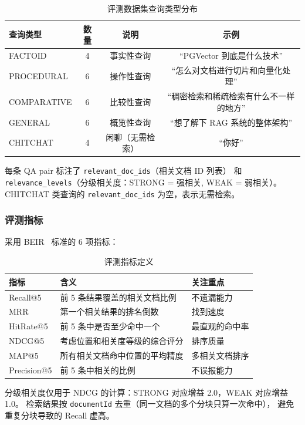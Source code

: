 \documentclass[a4paper, 12pt]{ctexart}
\begin{document}
\begin{table}[H]
  \centering
  \caption{评测数据集查询类型分布}
  \label{tab:dataset}
  \begin{tabular}{lccc}
    \toprule
    查询类型 & 数量 & 说明 & 示例 \\
    \midrule
    FACTOID & 4 & 事实性查询 & ``PGVector 到底是什么技术'' \\
    PROCEDURAL & 6 & 操作性查询 & ``怎么对文档进行切片和向量化处理'' \\
    COMPARATIVE & 6 & 比较性查询 & ``稠密检索和稀疏检索有什么不一样的地方'' \\
    GENERAL & 6 & 概览性查询 & ``想了解下 RAG 系统的整体架构'' \\
    CHITCHAT & 4 & 闲聊（无需检索） & ``你好'' \\
    \bottomrule
  \end{tabular}
\end{table}

每条 QA pair 标注了 \texttt{relevant\_doc\_ids}（相关文档 ID 列表）
和 \texttt{relevance\_levels}（分级相关度：STRONG = 强相关, WEAK = 弱相关）。
CHITCHAT 类查询的 \texttt{relevant\_doc\_ids} 为空，表示无需检索。

\subsubsection{评测指标}

采用 BEIR~\cite{thakur2021beir} 标准的 6 项指标：

\begin{table}[H]
  \centering
  \caption{评测指标定义}
  \label{tab:metrics}
  \begin{tabular}{lll}
    \toprule
    指标 & 含义 & 关注重点 \\
    \midrule
    Recall@5 & 前 5 条结果覆盖的相关文档比例 & 不遗漏能力 \\
    MRR & 第一个相关结果的排名倒数 & 找到速度 \\
    HitRate@5 & 前 5 条中是否至少命中一个 & 最直观的命中率 \\
    NDCG@5 & 考虑位置和相关度等级的综合评分 & 排序质量 \\
    MAP@5 & 所有相关文档命中位置的平均精度 & 多相关文档排序 \\
    Precision@5 & 前 5 条中相关的比例 & 不误报能力 \\
    \bottomrule
  \end{tabular}
\end{table}

分级相关度仅用于 NDCG 的计算：STRONG 对应增益 2.0，WEAK 对应增益 1.0。
检索结果按 \texttt{documentId} 去重（同一文档的多个分块只算一次命中），
避免重复分块导致的 Recall 虚高。
\end{document}
